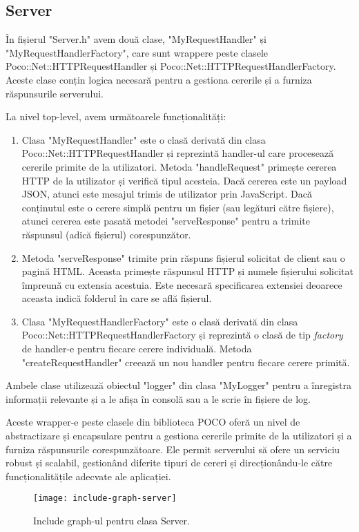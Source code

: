 \subsection{Server}

În fișierul "Server.h" avem două clase, "MyRequestHandler" și "MyRequestHandlerFactory", care sunt wrappere peste clasele Poco::Net::HTTPRequestHandler și Poco::Net::HTTPRequestHandlerFactory. Aceste clase conțin logica necesară pentru a gestiona cererile și a furniza răspunsurile serverului.

La nivel top-level, avem următoarele funcționalități:

\begin{enumerate}
  \item Clasa "MyRequestHandler" este o clasă derivată din clasa Poco::Net::HTTPRequestHandler și reprezintă handler-ul care procesează cererile primite de la utilizatori. Metoda "handleRequest" primește cererea HTTP de la utilizator și verifică tipul acesteia. Dacă cererea este un payload JSON, atunci este mesajul trimis de utilizator prin JavaScript. Dacă conținutul este o cerere simplă pentru un fișier (sau legături către fișiere), atunci cererea este pasată metodei "serveResponse" pentru a trimite răspunsul (adică fișierul) corespunzător.

  \item Metoda "serveResponse" trimite prin răspuns fișierul solicitat de client sau o pagină HTML. Aceasta primește răspunsul HTTP și numele fișierului solicitat împreună cu extensia acestuia. Este necesară specificarea extensiei deoarece aceasta indică folderul în care se află fișierul.

  \item Clasa "MyRequestHandlerFactory" este o clasă derivată din clasa Poco::Net::HTTPRequestHandlerFactory și reprezintă o clasă de tip \emph{factory} de handler-e pentru fiecare cerere individuală. Metoda "createRequestHandler" creează un nou handler pentru fiecare cerere primită.
\end{enumerate}

Ambele clase utilizează obiectul "logger" din clasa "MyLogger" pentru a înregistra informații relevante și a le afișa în consolă sau a le scrie în fișiere de log.

Aceste wrapper-e peste clasele din biblioteca POCO oferă un nivel de abstractizare și encapsulare pentru a gestiona cererile primite de la utilizatori și a furniza răspunsurile corespunzătoare. Ele permit serverului să ofere un serviciu robust și scalabil, gestionând diferite tipuri de cereri și direcționându-le către funcționalitățile adecvate ale aplicației.

\begin{figure}[h]
  \centering
  \texttt{[image: include-graph-server]}
  \caption{Include graph-ul pentru clasa Server.}
  \label{fig:includeGraphServer}
\end{figure}